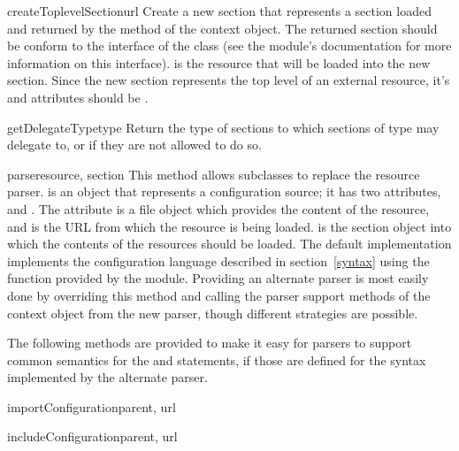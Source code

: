\documentclass{howto}
\begin{document}
\begin{methoddesc}{createToplevelSection}{url}
  Create a new section that represents a section loaded and returned
  by the  method of the context object.  The returned
  section should be conform to the interface of the
   class (see the
   module's documentation for more
  information on this interface).   is the resource that will
  be loaded into the new section.
  Since the new section represents the top level of an external
  resource, it's  and  attributes should be
  .
\end{methoddesc}

\begin{methoddesc}{getDelegateType}{type}
  Return the type of sections to which sections of type  may
  delegate to, or  if they are not allowed to do so.
\end{methoddesc}

\begin{methoddesc}{parse}{resource, section}
  This method allows subclasses to replace the resource parser.
   is an object that represents a configuration source;
  it has two attributes,  and .  The
   attribute is a file object which provides the content
  of the resource, and  is the URL from which the resource
  is being loaded.   is the section object into which the
  contents of the resources should be loaded.  The default
  implementation implements the configuration language described in
  section~\ref{syntax} using the  function provided
  by the  module.  Providing an
  alternate parser is most easily done by overriding this method and
  calling the parser support methods of the context object from the
  new parser, though different strategies are possible.
\end{methoddesc}

The following methods are provided to make it easy for parsers to
support common semantics for the  and
 statements, if those are defined for the syntax
implemented by the alternate parser.

\begin{methoddesc}{importConfiguration}{parent, url}
\end{methoddesc}

\begin{methoddesc}{includeConfiguration}{parent, url}
\end{methoddesc}
\end{document}

